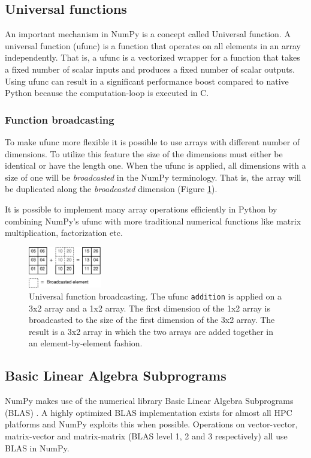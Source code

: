 \documentclass{sigplanconf}
\begin{document}
\subsection{Universal functions}
An important mechanism in NumPy is a concept called Universal function. A universal function (ufunc) is a function that operates on all elements in an array independently. That is, a ufunc is a vectorized wrapper for a function that takes a fixed number of scalar inputs and produces a fixed number of scalar outputs. Using ufunc can result in a significant performance boost compared to native Python because the computation-loop is executed in C.

\subsubsection{Function broadcasting}
To make ufunc more flexible it is possible to use arrays with different number of dimensions. To utilize this feature the size of the dimensions must either be identical or have the length one. When the ufunc is applied, all dimensions with a size of one will be \emph{broadcasted} in the NumPy terminology. That is, the array will be duplicated along the \emph{broadcasted} dimension (Figure \ref{fig:ufunc_broadcast}).

It is possible to implement many array operations efficiently in Python by combining NumPy's ufunc with more traditional numerical functions like matrix multiplication, factorization etc.

\begin{figure}
 \centering
 \includegraphics[width=120px]{gfx/ufunc_broadcast}
 \caption{Universal function broadcasting. The ufunc \texttt{addition} is applied on a 3x2 array and a 1x2 array. The first dimension of the 1x2 array is broadcasted to the size of the first dimension of the 3x2 array. The result is a 3x2 array in which the two arrays are added together in an element-by-element fashion.}
 \label{fig:ufunc_broadcast}
\end{figure}


\subsection{Basic Linear Algebra Subprograms}
NumPy makes use of the numerical library Basic Linear Algebra Subprograms (BLAS) \cite{blas79}. A highly optimized BLAS implementation exists for almost all HPC platforms and NumPy exploits this when possible. Operations on vector-vector, matrix-vector and matrix-matrix (BLAS level 1, 2 and 3 respectively) all use BLAS in NumPy. 
\end{document}
